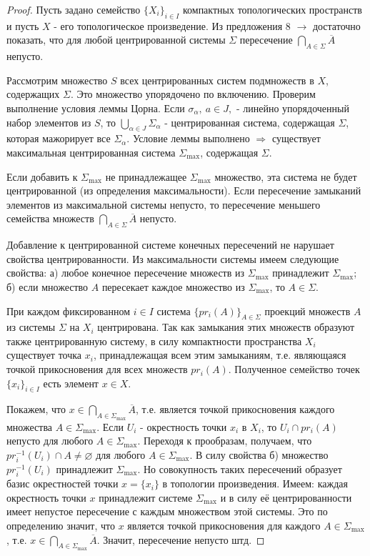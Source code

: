 \documentclass[12pt]{extarticle}
\theoremstyle{definition}
\begin{document}
    \begin{proof}
    Пусть задано семейство $\{X_i\}_{i \in I}$ компактных топологических пространств и пусть $X$ - его топологическое произведение. Из предложения 8 $\rightarrow$ достаточно показать, что для любой центрированной системы $\Sigma$ пересечение $\bigcap \limits_{A \in \Sigma} \overline{A}$ непусто.
    
    Рассмотрим множество $S$ всех центрированных систем подмножеств в $X$, содержащих $\Sigma$. Это множество упорядочено по включению. Проверим выполнение условия леммы Цорна. Если $\sigma_{\alpha},\ a \in J,$ - линейно упорядоченный набор элементов из $S$, то $\bigcup \limits_{\alpha \in J} \Sigma_{\alpha}$ - центрированная система, содержащая $\Sigma$, которая мажорирует все $\Sigma_{\alpha}$. Условие леммы выполнено $\Rightarrow$ существует максимальная центрированная система $\Sigma_{\max}$, содержащая $\Sigma$. 
    
    Если добавить к $\Sigma_{\max}$ не принадлежащее $\Sigma_{\max}$ множество, эта система не будет центрированной (из определения максимальности). Если пересечение замыканий элементов из максимальной системы непусто, то пересечение меньшего семейства множеств $\bigcap \limits_{A \in \Sigma} \overline{A}$ непусто.
    
    Добавление к центрированной системе конечных пересечений не нарушает свойства центрированности. Из максимальности системы имеем следующие свойства: а) любое конечное пересечение множеств из $\Sigma_{\max}$ принадлежит $\Sigma_{\max}$; б) если множество $A$ пересекает каждое множество из $\Sigma_{\max}$, то $A \in \Sigma$.
    
    При каждом фиксированном $i \in I$ система $\{pr_i(A)\}_{A \in \Sigma}$ проекций множеств $A$ из системы $\Sigma$ на $X_i$ центрирована. Так как замыкания этих множеств образуют также центрированную систему, в силу компактности пространства $X_i$ существует точка $x_i$, принадлежащая всем этим замыканиям, т.е. являющаяся точкой прикосновения для всех множеств $pr_i(A)$. Полученное семейство точек $\{x_i\}_{i \in I}$ есть элемент $x \in X$.
    
    Покажем, что $x \in \bigcap \limits_{A \in \Sigma_{\max}} \overline{A}$, т.е. является точкой прикосновения каждого множества $A \in \Sigma_{\max}$. Если $U_i$ - окрестность точки $x_i$ в $X_i$, то $U_i \cap pr_i(A)$ непусто для любого $A \in \Sigma_{\max}$. Переходя к прообразам, получаем, что $pr_i^{-1}(U_i) \cap A \neq \varnothing$ для любого $A \in \Sigma_{\max}$. В силу свойства б) множество $pr_i^{-1}(U_i)$ принадлежит $\Sigma_{\max}$. Но совокупность таких пересечений образует базис окрестностей точки $x = \{x_i\}$ в топологии произведения. Имеем: каждая окрестность точки $x$ принадлежит системе $\Sigma_{\max}$ и в силу её центрированности имеет непустое пересечение с каждым множеством этой системы. Это по определению значит, что $x$ является точкой прикосновения для каждого $A \in \Sigma_{\max}$, т.е. $x \in \bigcap \limits_{A \in \Sigma_{\max}} \overline{A}$. Значит, пересечение непусто штд.
    \end{proof}
    
\end{document}
